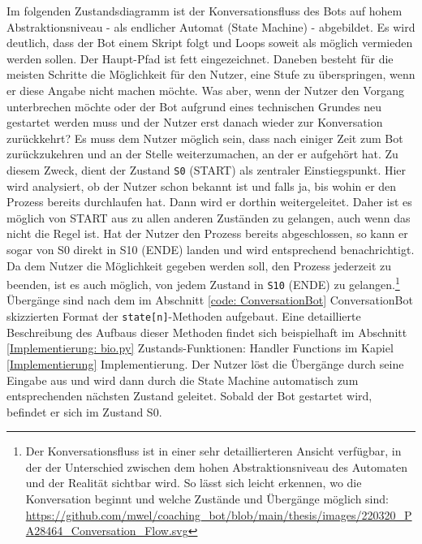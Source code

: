 	Im folgenden Zustandsdiagramm ist der Konversationsfluss des Bots auf hohem Abstraktionsniveau - als endlicher Automat (State Machine) - abgebildet. Es wird deutlich, dass der Bot einem Skript folgt und Loops soweit als möglich vermieden werden sollen. Der Haupt-Pfad ist fett eingezeichnet. Daneben besteht für die meisten Schritte die Möglichkeit für den Nutzer, eine Stufe zu überspringen, wenn er diese Angabe nicht machen möchte. Was aber, wenn der Nutzer den Vorgang unterbrechen möchte oder der Bot aufgrund eines technischen Grundes neu gestartet werden muss und der Nutzer erst danach wieder zur Konversation zurückkehrt? Es muss dem Nutzer möglich sein, dass nach einiger Zeit zum Bot zurückzukehren und an der Stelle weiterzumachen, an der er aufgehört hat. Zu diesem Zweck, dient der Zustand \verb|S0| (START) als zentraler Einstiegspunkt. Hier wird analysiert, ob der Nutzer schon bekannt ist und falls ja, bis wohin er den Prozess bereits durchlaufen hat. Dann wird er dorthin weitergeleitet. Daher ist es möglich von START aus zu allen anderen Zuständen zu gelangen, auch wenn das nicht die Regel ist. Hat der Nutzer den Prozess bereits abgeschlossen, so kann er sogar von S0 direkt in S10 (ENDE) landen und wird entsprechend benachrichtigt. Da dem Nutzer die Möglichkeit gegeben werden soll, den Prozess jederzeit zu beenden, ist es auch möglich, von jedem Zustand in \verb|S10| (ENDE) zu gelangen.\footnote{Der Konversationsfluss ist in einer sehr detaillierteren Ansicht verfügbar, in der der Unterschied zwischen dem hohen Abstraktionsniveau des Automaten und der Realität sichtbar wird. So lässt sich leicht erkennen, wo die Konversation beginnt und welche Zustände und Übergänge möglich sind: \url{https://github.com/mwel/coaching_bot/blob/main/thesis/images/220320_PA28464_Conversation_Flow.svg}} Übergänge sind nach dem im Abschnitt \ref{code: ConversationBot} ConversationBot skizzierten Format der \verb|state[n]|-Methoden aufgebaut. Eine detaillierte Beschreibung des Aufbaus dieser Methoden findet sich beispielhaft im Abschnitt \ref*{Implementierung: bio.py} Zustands-Funktionen: Handler Functions im Kapiel \ref*{Implementierung} Implementierung. Der Nutzer löst die Übergänge durch seine Eingabe aus und wird dann durch die State Machine automatisch zum entsprechenden nächsten Zustand geleitet.
	Sobald der Bot gestartet wird, befindet er sich im Zustand S0.
